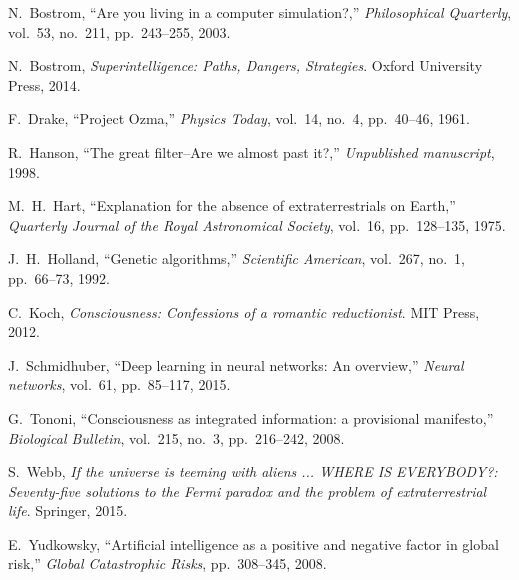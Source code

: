 \documentclass[12pt]{article}
\begin{document}
\begin{thebibliography}{99}

N.~Bostrom, ``Are you living in a computer simulation?,'' \textit{Philosophical Quarterly}, vol.~53, no.~211, pp.~243--255, 2003.

N.~Bostrom, \textit{Superintelligence: Paths, Dangers, Strategies}. Oxford University Press, 2014.

F.~Drake, ``Project Ozma,'' \textit{Physics Today}, vol.~14, no.~4, pp.~40--46, 1961.

R.~Hanson, ``The great filter--Are we almost past it?,'' \textit{Unpublished manuscript}, 1998.

M.~H.~Hart, ``Explanation for the absence of extraterrestrials on Earth,'' \textit{Quarterly Journal of the Royal Astronomical Society}, vol.~16, pp.~128--135, 1975.

J.~H.~Holland, ``Genetic algorithms,'' \textit{Scientific American}, vol.~267, no.~1, pp.~66--73, 1992.

C.~Koch, \textit{Consciousness: Confessions of a romantic reductionist}. MIT Press, 2012.

J.~Schmidhuber, ``Deep learning in neural networks: An overview,'' \textit{Neural networks}, vol.~61, pp.~85--117, 2015.

G.~Tononi, ``Consciousness as integrated information: a provisional manifesto,'' \textit{Biological Bulletin}, vol.~215, no.~3, pp.~216--242, 2008.

S.~Webb, \textit{If the universe is teeming with aliens ... WHERE IS EVERYBODY?: Seventy-five solutions to the Fermi paradox and the problem of extraterrestrial life}. Springer, 2015.

E.~Yudkowsky, ``Artificial intelligence as a positive and negative factor in global risk,'' \textit{Global Catastrophic Risks}, pp.~308--345, 2008.

\end{thebibliography}
\end{document}
